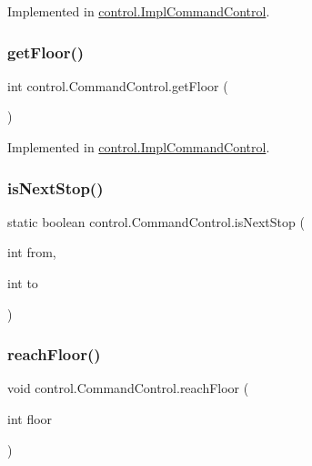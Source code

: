 Implemented in \mbox{\hyperlink{classcontrol_1_1_impl_command_control_a9734880304099b72e4a65dbfe6a510a1}{control.\+Impl\+Command\+Control}}.

\mbox{\label{interfacecontrol_1_1_command_control_abfefcf986aceb87768275e04df3653f5}} 
\subsubsection{\texorpdfstring{getFloor()}{getFloor()}}
{\footnotesize\ttfamily int control.\+Command\+Control.\+get\+Floor (\begin{DoxyParamCaption}{ }\end{DoxyParamCaption})}



Implemented in \mbox{\hyperlink{classcontrol_1_1_impl_command_control_a03e231769f2023d9f381980a34057ad6}{control.\+Impl\+Command\+Control}}.

\mbox{\label{interfacecontrol_1_1_command_control_a4b2de21fece2328d079558688927fad2}} 
\subsubsection{\texorpdfstring{isNextStop()}{isNextStop()}}
{\footnotesize\ttfamily static boolean control.\+Command\+Control.\+is\+Next\+Stop (\begin{DoxyParamCaption}\item[{int}]{from,  }\item[{int}]{to }\end{DoxyParamCaption})\hspace{0.3cm}{\ttfamily [static]}}

\mbox{\label{interfacecontrol_1_1_command_control_aed88af210353f0e854d6da8af1089851}} 
\subsubsection{\texorpdfstring{reachFloor()}{reachFloor()}}
{\footnotesize\ttfamily void control.\+Command\+Control.\+reach\+Floor (\begin{DoxyParamCaption}\item[{int}]{floor }\end{DoxyParamCaption})}



